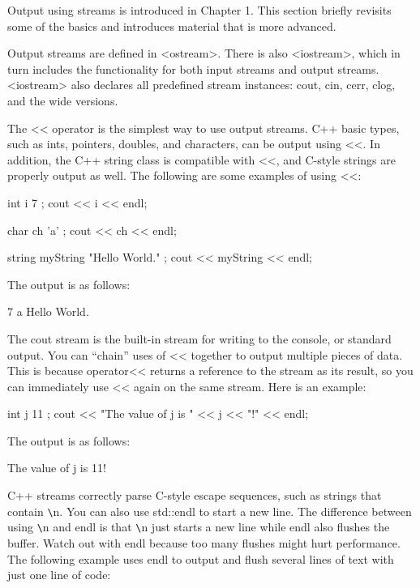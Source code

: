 
Output using streams is introduced in Chapter 1. This section briefly revisits some of the basics and introduces material that is more advanced.


Output streams are defined in <ostream>. There is also <iostream>, which in turn includes the functionality for both input streams and output streams. <iostream> also declares all predefined stream instances: cout, cin, cerr, clog, and the wide versions.

The <{}< operator is the simplest way to use output streams. C++ basic types, such as ints, pointers, doubles, and characters, can be output using <{}<. In addition, the C++ string class is compatible with <{}<, and C-style strings are properly output as well. The following are some examples of using <{}<:

\begin{cpp}
int i { 7 };
cout << i << endl;

char ch { 'a' };
cout << ch << endl;

string myString { "Hello World." };
cout << myString << endl;
\end{cpp}

The output is as follows:

\begin{shell}
7
a
Hello World.
\end{shell}

The cout stream is the built-in stream for writing to the console, or standard output. You can “chain” uses of <{}< together to output multiple pieces of data. This is because operator<{}< returns a reference to the stream as its result, so you can immediately use <{}< again on the same stream. Here is an example:

\begin{cpp}
int j { 11 };
cout << "The value of j is " << j << "!" << endl;
\end{cpp}

The output is as follows:

\begin{shell}
The value of j is 11!
\end{shell}

C++ streams correctly parse C-style escape sequences, such as strings that contain \verb|\|n. You can also use std::endl to start a new line. The difference between using \verb|\|n and endl is that \verb|\|n just starts a new line while endl also flushes the buffer. Watch out with endl because too many flushes might hurt performance. The following example uses endl to output and flush several lines of text with just one line of code:

